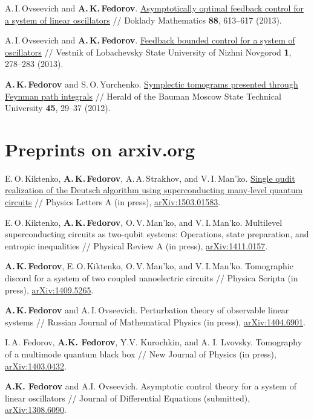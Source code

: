 \documentclass[10pt,a4paper,sans]{moderncv}
\begin{document}
	{A.\,I.\,Ovseevich and \textbf{A.\,K.\,Fedorov}. 
	{\textcolor{blue}{\href{http://dx.doi.org/10.1134/S106456241305013X}{Asymptotically optimal feedback control for a system of linear oscillators}}} // 
	Doklady Mathematics \textbf{88}, 613--617 (2013).}
	
	{A.\,I.\,Ovseevich and \textbf{A.\,K.\,Fedorov}. 
	{\textcolor{blue}{\href{http://www.unn.ru/eng/publications/vestnik.html?anum=6280}{Feedback bounded control for a system of oscillators}}} // 
	Vestnik of Lobachevsky State University of Nizhni Novgorod \textbf{1}, 278--283 (2013).}
	
	{\textbf{A.\,K.\,Fedorov} and S.\,O.\,Yurchenko. 
	{\textcolor{blue}{\href{http://vestniken.bmstu.ru/eng/catalog/phys/hidden/81.html}{Symplectic tomograms presented through Feynman path integrals}}} // 
	Herald of the Bauman Moscow State Technical University \textbf{45}, 29--37 (2012).}
	
\section{Preprints on arxiv.org}

	{E.\,O.\,Kiktenko, \textbf{A.\,K.\,Fedorov}, A.\,A.\,Strakhov, and V.\,I.\,Man'ko. 
	{\textcolor{blue}{\href{http://dx.doi.org/10.1016/j.physleta.2015.03.023}{Single qudit realization of the Deutsch algorithm using superconducting many-level quantum circuits}}} // 
	Physics Letters A (in press),
	{\textcolor{blue}{\href{http://arxiv.org/abs/1503.01583}{arXiv:1503.01583}}}.} 

	{E.\,O.\,Kiktenko, \textbf{A.\,K.\,Fedorov}, O.\,V.\,Man'ko, and V.\,I.\,Man'ko. 
	Multilevel superconducting circuits as two-qubit systems: Operations, state preparation, and entropic inequalities // 
	Physical Review A (in press),
	{\textcolor{blue}{\href{http://arxiv.org/abs/1411.0157}{arXiv:1411.0157}}}.} 

	{\textbf{A.\,K.\,Fedorov}, E.\,O.\,Kiktenko, O.\,V.\,Man'ko, and V.\,I.\,Man'ko. 
	Tomographic discord for a system of two coupled nanoelectric circuits // Physica Scripta (in press),
	{\textcolor{blue}{\href{http://arxiv.org/abs/1409.5265}{arXiv:1409.5265}}}.} %

	{\textbf{A.\,K.\,Fedorov} and A.\,I.\,Ovseevich. 
	Perturbation theory of observable linear systems // 
	Russian Journal of Mathematical Physics (in press),
	{\textcolor{blue}{\href{http://arxiv.org/abs/1404.6901}{arXiv:1404.6901}}}.}

	{I.\,A. Fedorov, \textbf{A.K. Fedorov}, Y.V. Kurochkin, and A. I. Lvovsky. 
	Tomography of a multimode quantum black box
	// New Journal of Physics (in press),
	{\textcolor{blue}{\href{http://arxiv.org/abs/1403.0432}{arXiv:1403.0432}}}.}
		
	{\textbf{A.K. Fedorov} and A.I. Ovseevich. 
	Asymptotic control theory for a system of linear oscillators // Journal of Differential Equations (submitted),
	{\textcolor{blue}{\href{http://arxiv.org/abs/1308.6090}{arXiv:1308.6090}}}.}
	
\end{document}
